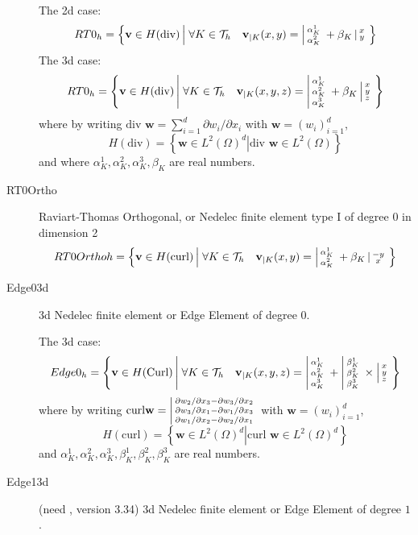 \documentclass[a4paper,twoside,12pt]{book}
\def\p{\partial}
\begin{document}
\begin{description}
     The 2d case:
     \begin{equation}
         RT0_{h} = \left\{ \mathbf{v} \in H(\textrm{div}) \left|\; \forall K \in
         \mathcal{T}_{h} \quad  \mathbf{v}_{|K}(x,y) =
         \left|\begin{smallmatrix} \alpha^1_{K} \\ \alpha^2_{K} \end{smallmatrix}\right. + \beta_{K}\left|\begin{smallmatrix} x \\ y \end{smallmatrix}\right.  \right.\right\}
         \label{eq:RT0}
     \end{equation}
     The 3d case:
     \begin{equation}
         RT0_{h} = \left\{ \mathbf{v} \in H(\textrm{div}) \left|\; \forall K \in
         \mathcal{T}_{h} \quad  \mathbf{v}_{|K}(x,y,z) =
         \left|\begin{smallmatrix} \alpha^1_{K} \\ \alpha^2_{K} \\ \alpha^3_{K}\end{smallmatrix}\right. + \beta_{K}\left|\begin{smallmatrix} x \\ y \\ z\end{smallmatrix}\right.  \right.\right\}
        \label{eq:RT03d}
     \end{equation}
      where by writing
      $\textrm{div }\mathbf{w}=\sum_{i=1}^d\p w_i/\p x_i$ with
      $ \mathbf{w}=(w_i)_{i=1}^d$,
      $$
      H(\textrm{div})=\left\{\mathbf{w}\in L^{2}(\Omega)^d\left|
      \textrm{div } \mathbf{w}\in L^{2}(\Omega)
      \right.\right\}
      $$
      and where
      $\alpha^1_{K},\alpha^2_{K},\alpha^3_{K},\beta_{K} $ are real numbers.
      
   \item[RT0Ortho]  Raviart-Thomas Orthogonal, or Nedelec finite element type I of degree $0$ in dimension 2
     \begin{equation}
         RT0Ortho{h} = \left\{ \mathbf{v} \in H(\textrm{curl}) \left|\; \forall K \in
         \mathcal{T}_{h} \quad  \mathbf{v}_{|K}(x,y) =
         \left|\begin{smallmatrix} \alpha^1_{K} \\ \alpha^2_{K} \end{smallmatrix}\right. + \beta_{K}\left|\begin{smallmatrix} -y \\ x \end{smallmatrix}\right.  \right.\right\}
         \label{RT0Ortho}
     \end{equation}      
      
     \item[Edge03d]  3d Nedelec finite element or Edge  Element of degree $0$.

     The 3d case:
     \begin{equation}
         Edge0_{h} = \left\{ \mathbf{v} \in H(\textrm{Curl}) \left|\; \forall K \in
         \mathcal{T}_{h} \quad  \mathbf{v}_{|K}(x,y,z) =
         \left|\begin{smallmatrix} \alpha^1_{K} \\ \alpha^2_{K} \\ \alpha^3_{K}\end{smallmatrix}\right. + \left|\begin{smallmatrix} \beta^1_{K} \\ \beta^2_{K} \\ \beta^3_{K}\end{smallmatrix}\right.\times\left|\begin{smallmatrix} x \\ y \\ z\end{smallmatrix}\right.  \right.\right\}
         \label{eq:Edge03d}
     \end{equation}
      where by writing
      $\textrm{curl}\mathbf{w}=\vectthree{\p w_2/\p x_3-\p w_3/\p x_2}{\p w_3/\p x_1-\p w_1/\p x_3}{\p w_1/\p x_2-\p w_2/\p x_1}$ with
      $ \mathbf{w}=(w_i)_{i=1}^d$,
      $$
      H(\textrm{curl})=\left\{\mathbf{w}\in L^{2}(\Omega)^d\left|
      \textrm{curl } \mathbf{w}\in L^{2}(\Omega)^d
      \right.\right\}
      $$
      and
      $\alpha^1_{K},\alpha^2_{K},\alpha^3_{K},\beta^1_{K},\beta^2_{K},\beta^3_{K} $ are real numbers.
      \item[Edge13d] (need , version 3.34) 3d Nedelec finite element or Edge  Element of degree $1$. 


\end{description}
\end{document}
